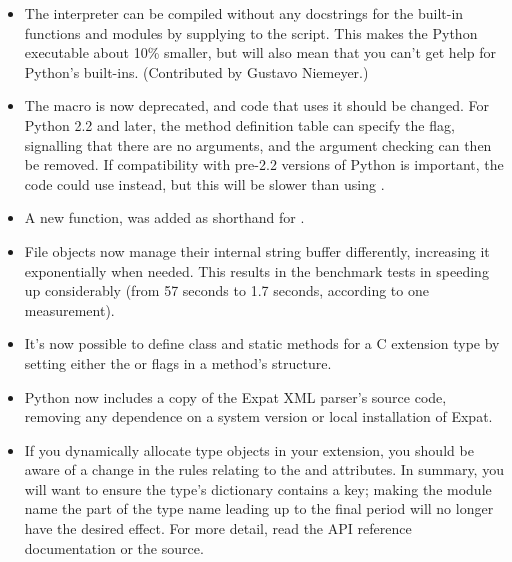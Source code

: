 \documentclass{howto}
\begin{document}
\begin{itemize}
\item The interpreter can be compiled without any docstrings for
the built-in functions and modules by supplying
 to the  script.
This makes the Python executable about 10\% smaller, but will also
mean that you can't get help for Python's built-ins.  (Contributed by
Gustavo Niemeyer.)

\item The  macro is now deprecated, and code
that uses it should be changed.  For Python 2.2 and later, the method
definition table can specify the
 flag, signalling that there are no arguments, and
the argument checking can then be removed.  If compatibility with
pre-2.2 versions of Python is important, the code could use
 instead, but this will be slower
than using .

\item A new function,  was added as shorthand for
.

\item File objects now manage their internal string buffer
differently, increasing it exponentially when needed.  This results in
the benchmark tests in  speeding up
considerably (from 57 seconds to 1.7 seconds, according to one
measurement).

\item It's now possible to define class and static methods for a C
extension type by setting either the  or
 flags in a method's 
structure.

\item Python now includes a copy of the Expat XML parser's source code,
removing any dependence on a system version or local installation of
Expat.

\item If you dynamically allocate type objects in your extension, you
should be aware of a change in the rules relating to the
 and  attributes.  In summary,
you will want to ensure the type's dictionary contains a
 key; making the module name the part of the type
name leading up to the final period will no longer have the desired
effect.  For more detail, read the API reference documentation or the 
source.

\end{itemize}
\end{document}
